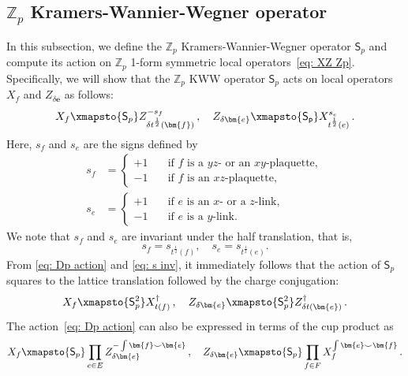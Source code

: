 \documentclass[aps,twocolumn,prx,floatfix,preprintnumbers, nofootinbib,10pt]{revtex4-2}
\numberwithin{equation}{section}
\theoremstyle{definition}
\theoremstyle{remark}
\theoremstyle{claim}
\renewcommand{\sf}[1]{\mathsf{#1}}
\begin{document}
\subsection{$\mathbb{Z}_p$ Kramers-Wannier-Wegner operator}
\label{sec: Zp Kramers-Wannier-Wegner operator}
In this subsection, we define the $\mathbb{Z}_p$ Kramers-Wannier-Wegner operator $\mathsf{S}_p$ and compute its action on $\mathbb{Z}_p$ 1-form symmetric local operators~\eqref{eq: XZ Zp}.
Specifically, we will show that the $\mathbb{Z}_p$ KWW operator $\mathsf{S}_p$ acts on local operators $X_f$ and $Z_{\delta \bm{e}}$ as follows:
\begin{equation}
X_f \xmapsto{\sf{S}_p} Z_{\delta t^{\frac{1}{2}}(\bm{f})}^{-s_f}\,, \quad
Z_{\delta \bm{e}} \xmapsto{\sf{S_p}} X_{t^{\frac{1}{2}}(e)}^{s_e} \,.
\label{eq: Dp action}
\end{equation}
Here, $s_f$ and $s_e$ are the signs defined by
\begin{align}
s_f &=
\begin{cases}
+1 \quad &\text{if $f$ is a $yz$- or an $xy$-plaquette},\\
-1 \quad &\text{if $f$ is an $xz$-plaquette},
\end{cases}
\label{eq: sf}
\\
s_e &=
\begin{cases}
+1 \quad &\text{if $e$ is an $x$- or a $z$-link}, \\
-1 \quad &\text{if $e$ is a $y$-link}.
\end{cases}
\label{eq: se}
\end{align}
We note that $s_f$ and $s_e$ are invariant under the half translation, that is,
\begin{equation}
s_f = s_{t^{\frac{1}{2}}(f)}, \quad
s_e = s_{t^{\frac{1}{2}}(e)}.
\label{eq: s inv}
\end{equation}
From \eqref{eq: Dp action} and \eqref{eq: s inv}, it immediately follows that the action of $\mathsf{S}_p$ squares to the lattice translation followed by the charge conjugation:
\begin{equation}
X_f \xmapsto{\sf{S}_p^2} X_{t(f)}^{\dagger}\,, \quad
Z_{\delta \bm{e}} \xmapsto{\sf{S}_p^2} Z_{\delta t(\bm{e})}^{\dagger} \,.
\end{equation}
The action~\eqref{eq: Dp action} can also be expressed in terms of the cup product as
\begin{equation}
X_f \xmapsto{\sf{S}_p} \prod_{e \in E} Z_{\delta \bm{e}}^{-\int \bm{f} \smile \bm{e}} \,, \quad
Z_{\delta \bm{e}} \xmapsto{\sf{S}_p} \prod_{f \in F} X_f^{\int \bm{e} \smile \bm{f}} \,.
\end{equation}
\end{document}
